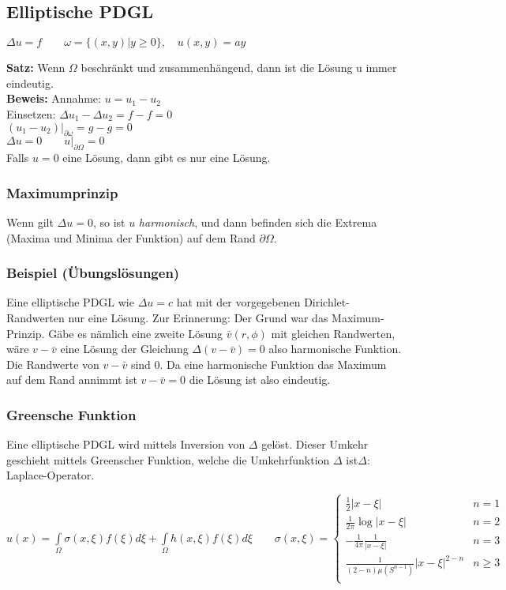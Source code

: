 \subsection{Elliptische PDGL}
$\Delta u=f\qquad \omega=\{(x,y)|y\geq 0\},\quad u(x,y)=ay$

\textbf{Satz:} Wenn $\Omega$ beschränkt und zusammenhängend, dann ist die Lösung u immer eindeutig.\\

\textbf{Beweis:} Annahme: $u=u_1-u_2$\\
Einsetzen: $\Delta u_1 - \Delta u_2=f-f=0$\\
$\left.(u_1-u_2)\right|_{\partial \omega}=g-g=0$\\
$\Delta u=0 \qquad \left.u\right|_{\partial\Omega}=0$\\
Falls $u=0$ eine Lösung, dann gibt es nur eine Lösung.

\subsubsection{Maximumprinzip} 

Wenn gilt $\Delta u=0$, so ist $u$ \emph{harmonisch}, und dann befinden 
sich die Extrema (Maxima und Minima der Funktion) auf dem Rand $\partial\Omega$.

\subsubsection{Beispiel (Übungslösungen)}
Eine elliptische PDGL wie $\Delta u = c$ hat mit der vorgegebenen
Dirichlet-Randwerten nur eine Lösung. Zur Erinnerung: Der Grund war das
Maximum-Prinzip. Gäbe es nämlich eine zweite Lösung $\bar v(r,\phi)$ mit
gleichen Randwerten, wäre $v - \bar v$ eine Lösung der Gleichung $\Delta (v -
\bar v) = 0$ also harmonische Funktion. Die Randwerte von $v - \bar v$ sind 0. Da eine
harmonische Funktion das Maximum auf dem Rand annimmt ist $v - \bar v = 0$ die
Lösung ist also eindeutig.

\newpage
\subsubsection{Greensche Funktion} 

Eine elliptische PDGL wird mittels Inversion von $\Delta$ gelöst. Dieser Umkehr geschieht mittels Greenscher Funktion, welche die Umkehrfunktion $\Delta$ ist\qquad $\Delta$: Laplace-Operator.

$u(x)=\int\limits_\Omega{\sigma(x,\xi)f(\xi)d\xi}+\int\limits_\Omega{h(x,\xi)f(\xi)d\xi}\qquad \sigma(x,\xi)=
\begin{cases}
	\frac 12|x-\xi| & n=1\\ 
	\frac 1{2\pi}\log|x-\xi| & n=2\\
	-\frac 1{4\pi}\frac{1}{|x-\xi|} & n=3\\
	\frac {1}{(2-n)\mu(S^{n-1})}|x-\xi|^{2-n} & n\geq 3\\
\end{cases}$\\


